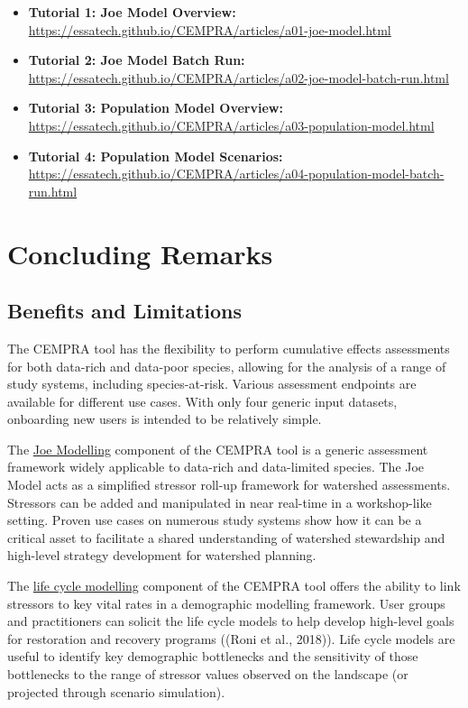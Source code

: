 \documentclass[
  letterpaper,
  DIV=11,
  numbers=noendperiod]{scrreprt}
\providecommand{\tightlist}{%
  \setlength{\itemsep}{0pt}\setlength{\parskip}{0pt}}
\begin{document}
\begin{itemize}
\tightlist
\item
  \textbf{Tutorial 1: Joe Model Overview:}
  \url{https://essatech.github.io/CEMPRA/articles/a01-joe-model.html}
\item
  \textbf{Tutorial 2: Joe Model Batch Run:}
  \url{https://essatech.github.io/CEMPRA/articles/a02-joe-model-batch-run.html}
\item
  \textbf{Tutorial 3: Population Model Overview:}
  \url{https://essatech.github.io/CEMPRA/articles/a03-population-model.html}
\item
  \textbf{Tutorial 4: Population Model Scenarios:}
  \url{https://essatech.github.io/CEMPRA/articles/a04-population-model-batch-run.html}
\end{itemize}


\chapter{Concluding Remarks}\label{concluding-remarks}

\section{Benefits and
Limitations}\label{11_conclusions-benefits-and-limitations}

The CEMPRA tool has the flexibility to perform cumulative effects
assessments for both data-rich and data-poor species, allowing for the
analysis of a range of study systems, including species-at-risk. Various
assessment endpoints are available for different use cases. With only
four generic input datasets, onboarding new users is intended to be
relatively simple.

The \hyperref[modelling-pathways-and-assessment-endpoints]{Joe
Modelling} component of the CEMPRA tool is a generic assessment
framework widely applicable to data-rich and data-limited species. The
Joe Model acts as a simplified stressor roll-up framework for watershed
assessments. Stressors can be added and manipulated in near real-time in
a workshop-like setting. Proven use cases on numerous study systems show
how it can be a critical asset to facilitate a shared understanding of
watershed stewardship and high-level strategy development for watershed
planning.

The \hyperref[life-cycle-model-population-model-overview]{life cycle
modelling} component of the CEMPRA tool offers the ability to link
stressors to key vital rates in a demographic modelling framework. User
groups and practitioners can solicit the life cycle models to help
develop high-level goals for restoration and recovery programs ((Roni et
al., 2018)). Life cycle models are useful to identify key demographic
bottlenecks and the sensitivity of those bottlenecks to the range of
stressor values observed on the landscape (or projected through scenario
simulation).
\end{document}
